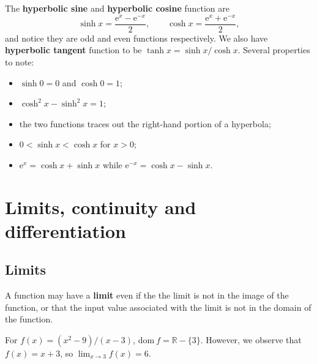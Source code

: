 \documentclass[letter-paper]{tufte-book}
\newenvironment{example}[1][Example]{\begin{trivlist}
\item[\hskip \labelsep {\bfseries #1}]}{\end{trivlist}}
\newcommand{\ex}{\mathrm{e}}
\newcommand\Def[1]{\textbf{#1}}
\begin{document}
The \Def{hyperbolic sine} and \Def{hyperbolic cosine} function are
\begin{equation*}
  \sinh x=\frac{\ex^x - \ex^{-x}}{2},\qquad \cosh x=\frac{\ex^x + \ex^{-x}}{2},
\end{equation*}
and notice they are odd and even functions respectively. We also have 
\Def{hyperbolic tangent} function to be $\tanh x = \sinh x / \cosh x$. 
Several properties to note:
\begin{itemize}
  \item $\sinh 0 = 0$ and $\cosh 0 = 1$;
  \item $\cosh^2 x- \sinh^2 x = 1$;
  \item the two functions traces out the right-hand portion of a hyperbola;
  \item $0 < \sinh x < \cosh x$ for $x > 0$;
  \item $\ex^x = \cosh x + \sinh x$ while $\ex^{-x} = \cosh x - \sinh x$.
\end{itemize}


\chapter{Limits, continuity and differentiation}


\section{Limits}

A function may have a \Def{limit} even if the the limit is not in the
image of the function, or that the input value associated with the limit is
not in the domain of the function.
\begin{example}
  For $f(x)=(x^2-9)/(x-3)$, $\mbox{dom}\ f=\mathbb{R}-\{3\}$. However, we 
  observe that $f(x)=x+3$, so $\lim_{x\rightarrow3} f(x)=6$.
\end{example}
\end{document}
